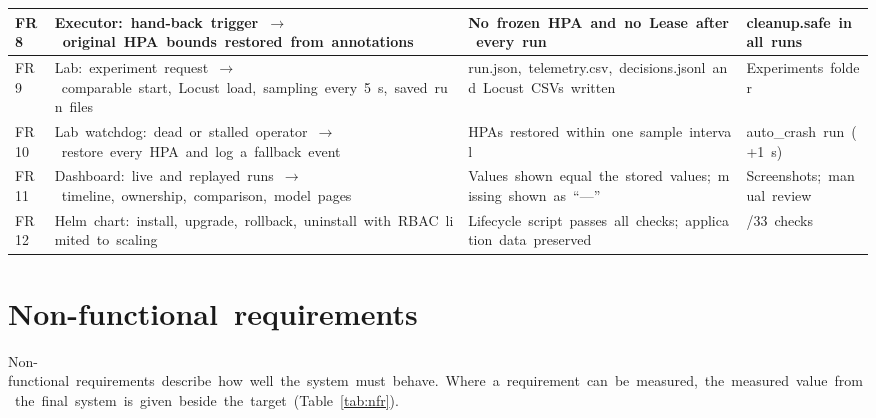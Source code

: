 \documentclass[12pt,a4paper,oneside]{report}
\begin{document}
\begin{longtable}{|>{\raggedright\arraybackslash}p{1.00cm}|>{\raggedright\arraybackslash}p{6.40cm}|>{\raggedright\arraybackslash}p{4.27cm}|>{\raggedright\arraybackslash}p{2.56cm}|}
FR8 & Executor:~hand-back~trigger~$\rightarrow$~original~HPA~bounds~restored~from~annotations & No~frozen~HPA~and~no~Lease~after~every~run & cleanup.safe~in~all~runs\\\hline
FR9 & Lab:~experiment~request~$\rightarrow$~comparable~start,~Locust~load,~sampling~every~5~s,~saved~run~files & run.json,~telemetry.csv,~decisions.jsonl~and~Locust~CSVs~written & Experiments~folder\\\hline
FR10 & Lab~watchdog:~dead~or~stalled~operator~$\rightarrow$~restore~every~HPA~and~log~a~fallback~event & HPAs~restored~within~one~sample~interval & auto\_crash~run~(+1~s)\\\hline
FR11 & Dashboard:~live~and~replayed~runs~$\rightarrow$~timeline,~ownership,~comparison,~model~pages & Values~shown~equal~the~stored~values;~missing~shown~as~``---'' & Screenshots;~manual~review\\\hline
FR12 & Helm~chart:~install,~upgrade,~rollback,~uninstall~with~RBAC~limited~to~scaling & Lifecycle~script~passes~all~checks;~application~data~preserved & 33/33~checks\\\hline
\end{longtable}\endgroup

\section{Non-functional~requirements}

Non-functional~requirements~describe~how~well~the~system~must~behave.~Where~a~requirement~can~be~measured,~the~measured~value~from~the~final~system~is~given~beside~the~target~(Table~\ref{tab:nfr}).
\end{document}
